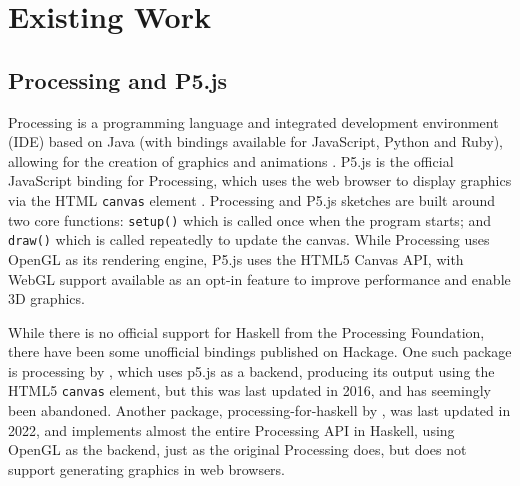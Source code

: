 \documentclass[../main.tex]{subfiles}
\begin{document}
    \section{Existing Work}
        \subsection{Processing and P5.js}
            Processing is a programming language and integrated development environment
                (IDE) based on Java (with bindings available for JavaScript, Python and Ruby),
                allowing for the creation of graphics and animations \citep{processing}.
            P5.js is the official JavaScript binding for Processing, which uses the web
                browser to display graphics via the HTML \texttt{canvas} element \citep{p5js}.
            Processing and P5.js sketches are built around two core functions:
                \texttt{setup()} which is called once when the program starts; and
                \texttt{draw()} which is called repeatedly to update the canvas.
            While Processing uses OpenGL as its rendering engine, P5.js uses the HTML5
                Canvas API, with WebGL support available as an opt-in feature \citep{p5WebGL}
                to improve performance and enable 3D graphics.

            While there is no official support for Haskell from the Processing Foundation,
                there have been some unofficial bindings published on Hackage.
            One such package is processing by \citet{hackageProcessing}, which uses p5.js
                as a backend, producing its output using the HTML5 \texttt{canvas} element, but
                this was last updated in 2016, and has seemingly been abandoned.
            Another package, processing-for-haskell by \citet{hackageProcessingForHaskell},
                was last updated in 2022, and implements almost the entire Processing API in
                Haskell, using OpenGL as the backend, just as the original Processing does, but
                does not support generating graphics in web browsers.
\end{document}
